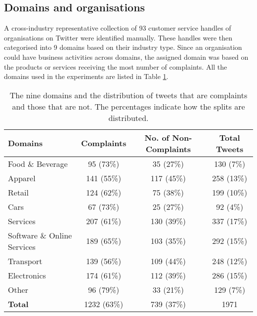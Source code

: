 \subsection{Domains and organisations}
A cross-industry representative collection of 93 customer service handles of organisations on Twitter were identified manually. These handles were then categorised into 9 domains based on their industry type. Since an organisation could have business activities across domains, the assigned domain was based on the products or services receiving the most number of complaints. All the domains used in the experiments are listed in Table \ref{tab: domains}. 
\begin{table}[ht]
    \centering
    \begin{tabular}{|l|c|c|c|}
    \hline
    \rowcolor[gray]{0.7}
    \textbf{Domains} & \textbf{Complaints} & \textbf{No. of Non-Complaints} & \textbf{Total Tweets}\\
    \hline
    Food \& Beverage & 95 (73\%) & 35 (27\%) & 130 (7\%)\\
    \rowcolor[gray]{0.9}
    Apparel & 141 (55\%) & 117 (45\%) & 258 (13\%)\\
    Retail & 124 (62\%)& 75 (38\%) & 199 (10\%)\\
    \rowcolor[gray]{0.9}
    Cars & 67 (73\%)& 25 (27\%) & 92 (4\%)\\
    Services  & 207 (61\%)& 130 (39\%) & 337 (17\%)\\
    \rowcolor[gray]{0.9}
    Software \& Online Services & 189 (65\%)& 103 (35\%) & 292 (15\%)\\
    Transport & 139 (56\%)& 109 (44\%) & 248 (12\%)\\
    \rowcolor[gray]{0.9}
    Electronics & 174 (61\%)& 112 (39\%) & 286 (15\%)\\
    Other & 96 (79\%)& 33 (21\%) & 129 (7\%)\\
    \hline
    \rowcolor[gray]{0.9}
    \textbf{Total} & 1232 (63\%)& 739 (37\%) & 1971\\
    \hline
    \end{tabular}
    \caption{The nine domains and the distribution of tweets that are complaints and those that are not. The percentages indicate how the splits are distributed.}    
    \label{tab: domains}
\end{table}  

